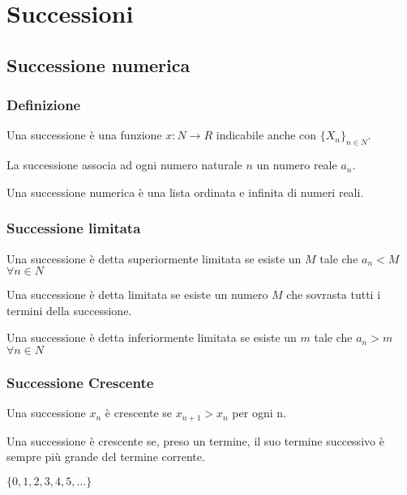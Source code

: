 \chapter{Successioni}

\section{Successione numerica}

\subsection{Definizione}

Una successione è una funzione $x : N \rightarrow R$ indicabile anche con $\{X_{n}\}_{n \in N}$.

\begin{tip}
La successione associa ad ogni numero naturale $n$ un numero reale $a_{n}$.

Una successione numerica è una lista ordinata e infinita di numeri reali.
\end{tip}

\subsection{Successione limitata}

Una successione è detta superiormente limitata se esiste un $M$ tale che $a_{n} < M$ $\forall n \in N$

\begin{tip}
Una successione è detta limitata se esiste un numero $M$ che sovrasta tutti i termini della successione. 
\end{tip}

Una successione è detta inferiormente limitata se esiste un $m$ tale che $a_{n} > m$ $\forall n \in N$

\subsection{Successione Crescente}

Una successione $x_{n}$ è crescente se $x_{n+1} > x_{n}$ per ogni n.

\begin{tip}
Una successione è crescente se, preso un termine, il suo termine successivo è sempre più grande del termine corrente.

$\{ 0, 1, 2, 3, 4, 5,\ldots \}$
\end{tip}

